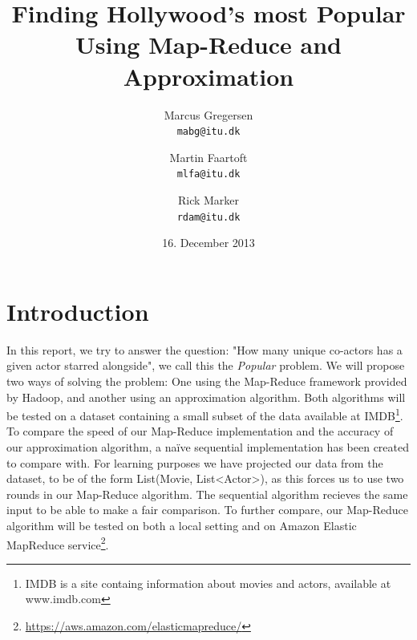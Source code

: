 \documentclass[a4paper,11pt]{article}
\begin{document}
\date{16. December 2013}
\title{Finding Hollywood's most Popular\\Using Map-Reduce and Approximation}

\author{Marcus Gregersen\\
\texttt{mabg@itu.dk} 
\and Martin Faartoft\\
\texttt{mlfa@itu.dk}
\and Rick Marker\\
\texttt{rdam@itu.dk}}
\clearpage\maketitle
\thispagestyle{empty}
\newpage
\setcounter{page}{1}
\section{Introduction}

In this report, we try to answer the question: "How many unique co-actors has a given actor starred alongside", we call this the \emph{Popular} problem. We will propose two ways of solving the problem: One using the Map-Reduce framework provided by Hadoop, and another using an approximation algorithm. Both algorithms will be tested on a dataset containing a small subset of the data available at IMDB\footnote{IMDB is a site containg information about movies and actors, available at www.imdb.com}.\\

To compare the speed of our Map-Reduce implementation and the accuracy of our approximation algorithm, a naïve sequential implementation has been created to compare with. For learning purposes we have projected our data from the dataset, to be of the form List(Movie, List<Actor>), as this forces us to use two rounds in our Map-Reduce algorithm. The sequential algorithm recieves the same input to be able to make a fair comparison. To further compare, our Map-Reduce algorithm will be tested on both a local setting and on Amazon Elastic MapReduce service\footnote{\url{https://aws.amazon.com/elasticmapreduce/}}.
\end{document}
